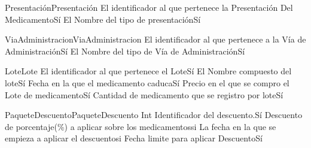 \begin{cdtEntidad}{Presentación}{Presentación}
		{El identificador al que pertenece la Presentación Del Medicamento}{Sí}
		{El Nombre del tipo de presentación}{Sí}

\end{cdtEntidad}

\begin{cdtEntidad}{ViaAdministracion}{ViaAdministracion}
		{El identificador al que pertenece a la Vía de Administración}{Sí}
		{El Nombre del tipo de Vía de Administración}{Sí}

\end{cdtEntidad}

\begin{cdtEntidad}{Lote}{Lote}
		{El identificador al que pertenece el Lote}{Sí}
		{El Nombre compuesto del lote}{Sí}
		{Fecha en la que el medicamento caduca}{Sí}
		{Precio en el que se compro el Lote de medicamento}{Sí}
		{Cantidad de medicamento que se registro por lote}{Sí}
\end{cdtEntidad}

\begin{cdtEntidad}{PaqueteDescuento}{PaqueteDescuento}
	Int
		{Identificador del descuento.}{Sí}
		{Descuento de porcentaje(\%) a aplicar sobre los medicamentos}{si}
		{La fecha en la que se empieza a aplicar el descuento}{si}
		{Fecha limite para aplicar Descuento}{Sí}
\end{cdtEntidad}

